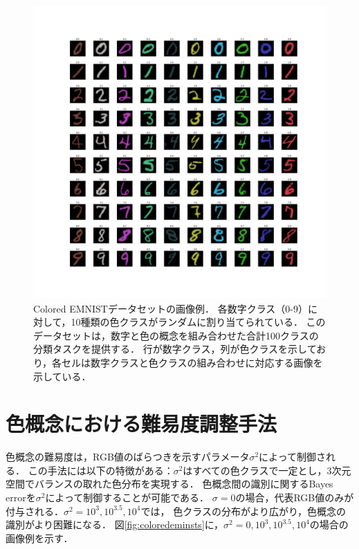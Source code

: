 \begin{figure}[H]
    \centering
    \includegraphics[width=1\columnwidth]{fig/coloredemnist_0.pdf}
    \caption[Colored EMNISTデータセットの画像例]{
        Colored EMNISTデータセットの画像例．
        各数字クラス（0-9）に対して，10種類の色クラスがランダムに割り当てられている．
        このデータセットは，数字と色の概念を組み合わせた合計100クラスの分類タスクを提供する．
        行が数字クラス，列が色クラスを示しており，各セルは数字クラスと色クラスの組み合わせに対応する画像を示している．
    }
    \label{fig:ColoredEMNIST}
\end{figure}

\newpage

\section{色概念における難易度調整手法}
色概念の難易度は，RGB値のばらつきを示すパラメータ$\sigma^2$によって制御される．
この手法には以下の特徴がある：$\sigma^2$はすべての色クラスで一定とし，3次元空間でバランスの取れた色分布を実現する．
色概念間の識別に関するBayes errorを$\sigma^2$によって制御することが可能である．
$\sigma = 0$の場合，代表RGB値のみが付与される．$\sigma^2 = 10^3, 10^{3.5}, 10^4$では，
色クラスの分布がより広がり，色概念の識別がより困難になる．
図\ref{fig:coloredeminsts}に，$\sigma^2 = 0, 10^3, 10^{3.5}, 10^4$の場合の画像例を示す．

